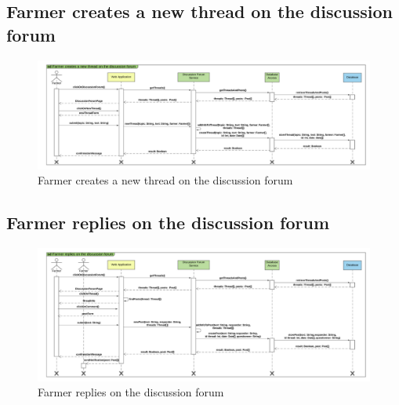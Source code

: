 \subsection{Farmer creates a new thread on the discussion forum}

\newpage
\begin{landscape}
\begin{figure}[h]
\vspace*{-2cm}
\noindent
\centering
\centerline{\includegraphics[scale= 0.108]{./Images/Sequence diagram/Farmer creates a new thread on the discussion forum.png}}
    \caption{Farmer creates a new thread on the discussion forum}
    \vspace*{-12cm}
\end{figure}
\fillandplacepagenumber
\end{landscape}

\subsection{Farmer replies on the discussion forum}

\newpage
\begin{landscape}
\begin{figure}[h]
\vspace*{-2cm}
\noindent
\centering
\centerline{\includegraphics[scale= 0.108]{./Images/Sequence diagram/Farmer replies on the discussion forum.png}}
    \caption{Farmer replies on the discussion forum}
    \vspace*{-12cm}
\end{figure}
\fillandplacepagenumber
\end{landscape}

